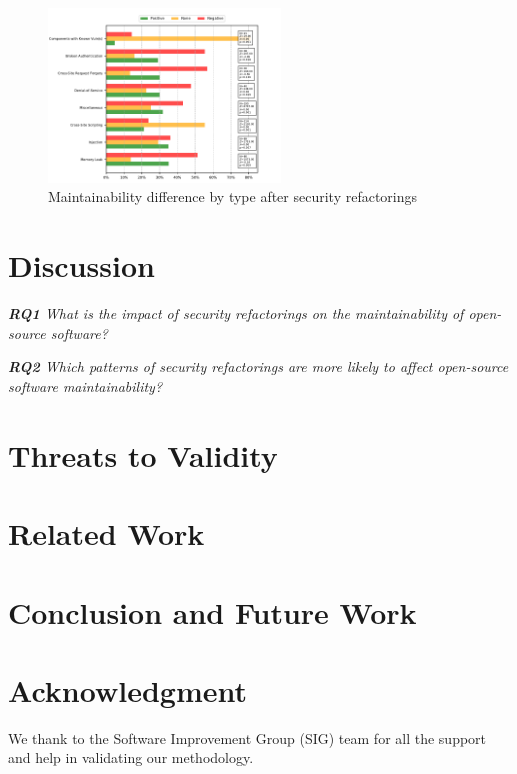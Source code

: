 \documentclass[10pt,conference]{IEEEtran}
\begin{document}
\begin{figure}[h]
 	\centering
 	\includegraphics[width=0.55\textwidth]{figures/category.pdf}
 	\caption{Maintainability difference by type after security refactorings}
	\label{fig:pat}
\end{figure}


\section{Discussion}\label{sec:discussion}


\begin{framed}
\textit{\textbf{RQ1} What is the impact of security refactorings on the maintainability of open-source software?}
\end{framed}


\begin{framed}
\textit{\textbf{RQ2} Which patterns of security refactorings are more likely to affect open-source software maintainability?}
\end{framed}



\section{Threats to Validity}\label{sec:threats}



\section{Related Work}\label{sec:rw}




\section{Conclusion and Future Work}\label{sec:conclusions}



\section*{Acknowledgment}\label{sec:ack}


We thank to the Software Improvement Group (SIG) team for all the support and help in validating our methodology.

{
 
  
}
\end{document}
